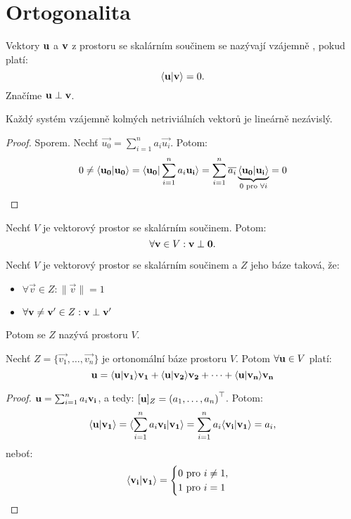 \section{Ortogonalita}

\begin{definition}
    Vektory $\mathbf{u}$ a $\mathbf{v}$ z prostoru se skalárním součinem se nazývají vzájemně
    , pokud platí: $$\langle \mathbf{u} | \mathbf{v} \rangle = 0.$$ 
    Značíme $\mathbf{u} \perp \mathbf{v}$.
\end{definition}

\begin{observation}
    Každý systém vzájemně kolmých netriviálních vektorů je lineárně nezávislý.
\end{observation}

\begin{proof}
    Sporem. Nechť $\vec{u_0} = \sum_{i=1}^n a_i\vec{u_i}$. Potom:
    $$ 0 \neq \langle \mathbf{u_0} | \mathbf{u_0} \rangle 
        = \langle \mathbf{u_0} | \sum_{i=1}^n a_i\mathbf{u_i} \rangle
        = \sum_{i=1}^n\overline{a_i}\underbrace{\langle \mathbf{u_0} | \mathbf{u_i} \rangle}_{0 \text{ pro } \forall i} = 0$$
\end{proof}

\begin{observation}
    Nechť $V$ je vektorový prostor se skalárním součinem. Potom:
    $$\forall \mathbf{v} \in V: \mathbf{v} \perp \mathbf{0}.$$
\end{observation}

\begin{definition}
    Nechť $V$ je vektorový prostor se skalárním součinem a $Z$ jeho báze 
    taková, že:
    \begin{itemize}
        \item $\forall \vec{v} \in Z: \|\vec{v}\| = 1$
        \item $\forall \mathbf{v} \neq \mathbf{v'} \in Z: \mathbf{v} \perp \mathbf{v'}$
    \end{itemize}
    Potom se $Z$ nazývá  prostoru $V$.
\end{definition}

\begin{proposition}
    Nechť $Z = \{\vec{v_1}, \dots, \vec{v_n}\}$ je ortonomální báze prostoru 
    $V$. Potom $\forall \mathbf{u} \in V$ platí:
    $$\mathbf{u} = \langle \mathbf{u} | \mathbf{v_1} \rangle\mathbf{v_1} + \langle \mathbf{u} | \mathbf{v_2} \rangle\mathbf{v_2} + 
        \dots + \langle \mathbf{u} | \mathbf{v_n} \rangle\mathbf{v_n}$$
\end{proposition}

\begin{proof}
    $\mathbf{u} = \sum_{i=1}^n a_i\mathbf{v_i}$, a tedy: 
    $[\mathbf{u}]_Z = \left( a_1,\dots,a_n\right)^\top$. Potom:
    $$\langle \mathbf{u} | \mathbf{v_1} \rangle = \langle \sum_{i=1}^n a_i\mathbf{v_i} | \mathbf{v_1} \rangle
        = \sum_{i=1}^n a_i \langle \mathbf{v_i} | \mathbf{v_1} \rangle = a_i,$$
    neboť:
    $$ \langle \mathbf{v_i} | \mathbf{v_1} \rangle = \begin{cases}
            0 \text{ pro } i \neq 1, \\
            1 \text{ pro } i = 1
        \end{cases}$$
\end{proof}

